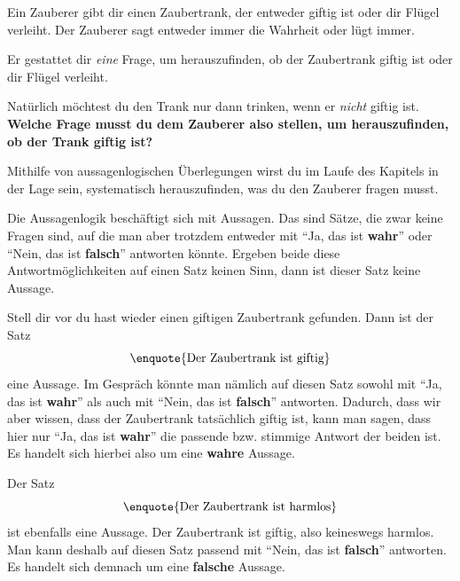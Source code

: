 \documentclass[../../main.tex]{subfiles}
\begin{document}
    \begin{example}
        
        Ein Zauberer gibt dir einen Zaubertrank, der entweder giftig ist oder dir Flügel verleiht. Der Zauberer sagt entweder immer die Wahrheit oder lügt immer.
        
        Er gestattet dir \emph{eine} Frage, um herauszufinden, ob der Zaubertrank giftig ist oder dir Flügel verleiht.
        
        Natürlich möchtest du den Trank nur dann trinken, wenn er \emph{nicht} giftig ist. \textbf{Welche Frage musst du dem Zauberer also stellen, um herauszufinden, ob der Trank giftig ist?}
        
        Mithilfe von aussagenlogischen Überlegungen wirst du im Laufe des Kapitels in der Lage sein, systematisch herauszufinden, was du den Zauberer fragen musst.
    \end{example}
    
    Die Aussagenlogik beschäftigt sich mit Aussagen. Das sind Sätze, die zwar keine Fragen sind, auf die man aber trotzdem entweder mit \enquote{Ja, das ist \textbf{wahr}} oder \enquote{Nein, das ist \textbf{falsch}} antworten könnte. Ergeben beide diese Antwortmöglichkeiten auf einen Satz keinen Sinn, dann ist dieser Satz keine Aussage.
    \begin{example}
        Stell dir vor du hast wieder einen giftigen Zaubertrank gefunden. Dann ist der Satz
        \[\textrm{\enquote{Der Zaubertrank ist giftig}}\]
        eine Aussage.
        Im Gespräch könnte man nämlich auf diesen Satz sowohl mit \enquote{Ja, das ist \textbf{wahr}} als auch mit \enquote{Nein, das ist \textbf{falsch}} antworten. 
        Dadurch, dass wir aber wissen, dass der Zaubertrank tatsächlich giftig ist, kann man sagen, dass hier nur \enquote{Ja, das ist \textbf{wahr}} die passende bzw. stimmige Antwort der beiden ist. Es handelt sich hierbei also um eine \textbf{wahre} Aussage.
        
        Der Satz
        \[\textrm{\enquote{Der Zaubertrank ist harmlos}}\]
        ist ebenfalls eine Aussage. Der Zaubertrank ist giftig, also keineswegs harmlos. Man kann deshalb auf diesen Satz passend mit \enquote{Nein, das ist \textbf{falsch}} antworten. Es handelt sich demnach um eine \textbf{falsche} Aussage.
    \end{example}
    
\end{document}
